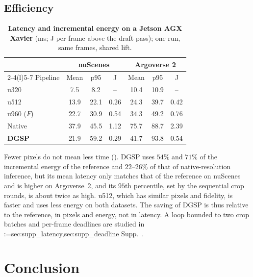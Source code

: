 \documentclass[10pt,twocolumn,letterpaper]{article}
\makeatletter
\newcommand{\method}{DGSP\xspace}
\newcommand{\full}{F}             %
\theoremstyle{definition}
\theoremstyle{remark}
\newcommand{\oursrow}{\rowcolor{oursbg}}
\newcommand{\na}{--}
\DeclareRobustCommand{\supp}[1]{\def\supp@list{}\@for\supp@i:=#1\do{\ifx\supp@list\@empty\edef\supp@list{S-\supp@i}\else\edef\supp@list{\supp@list,S-\supp@i}\fi}%
\edef\supp@cmd{\noexpand\Cref*{\supp@list}}Supp.~\supp@cmd}
\makeatother
\begin{document}
\subsection{Efficiency}
\label{sec:exp_latency}

\begin{table}[t]
\centering
\caption{\textbf{Latency and incremental energy on a Jetson AGX Xavier} (ms; J per frame above the draft pass); one run, same frames, shared lift.}
\label{tab:eff}
\footnotesize
\setlength{\tabcolsep}{3pt}
\begin{tabular}{@{}lcccccc@{}}
\toprule
& \multicolumn{3}{c}{nuScenes} & \multicolumn{3}{c}{Argoverse 2} \\
\cmidrule(lr){2-4}\cmidrule(l){5-7}
Pipeline & Mean & p95 & J & Mean & p95 & J \\
\midrule
u320 & 7.5 & 8.2 & \na & 10.4 & 10.9 & \na \\
u512 & 13.9 & 22.1 & 0.26 & 24.3 & 39.7 & 0.42 \\
u960 ($\full$) & 22.7 & 30.9 & 0.54 & 34.3 & 49.2 & 0.76 \\
Native & 37.9 & 45.5 & 1.12 & 75.7 & 88.7 & 2.39 \\
\midrule
\oursrow \textbf{\method} & 21.9 & 59.2 & 0.29 & 41.7 & 93.8 & 0.54 \\
\bottomrule
\end{tabular}
\end{table}

Fewer pixels do not mean less time ().
\method uses $54\%$ and $71\%$ of the incremental energy of the reference and $22$--$26\%$ of that of native-resolution inference, but its mean latency only matches that of the reference on nuScenes and is higher on Argoverse~2, and its $95$th percentile, set by the sequential crop rounds, is about twice as high.
u512, which has similar pixels and fidelity, is faster and uses less energy on both datasets.
The saving of \method is thus relative to the reference, in pixels and energy, not in latency.
A loop bounded to two crop batches and per-frame deadlines are studied in \supp{sec:supp_latency,sec:supp_deadline}.

\section{Conclusion}
\label{sec:conclusion}
\end{document}
